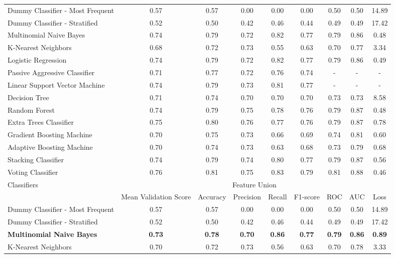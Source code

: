 \documentclass[Royal,sageapa,times]{sagej}
\begin{document}
\begin{landscape}
\begin{longtable}[l]{lcccccccc}
    Dummy Classifier - Most   Frequent & 0.57 & 0.57 & 0.00 & 0.00 & 0.00 & 0.50 & 0.50 & 14.89 \\
    Dummy Classifier - Stratified & 0.52 & 0.50 & 0.42 & 0.46 & 0.44 & 0.49 & 0.49 & 17.42 \\
    Multinomial Naive Bayes & 0.74 & 0.79 & 0.72 & 0.82 & 0.77 & 0.79 & 0.86 & 0.48 \\
    K-Nearest Neighbors & 0.68 & 0.72 & 0.73 & 0.55 & 0.63 & 0.70 & 0.77 & 3.34 \\
    Logistic Regression & 0.74 & 0.79 & 0.72 & 0.82 & 0.77 & 0.79 & 0.86 & 0.49 \\
    Passive Aggressive Classifier & 0.71 & 0.77 & 0.72 & 0.76 & 0.74 & - & - & - \\
    Linear Support Vector Machine & 0.74 & 0.79 & 0.73 & 0.81 & 0.77 & - & - & - \\
    Decision Tree & 0.71 & 0.74 & 0.70 & 0.70 & 0.70 & 0.73 & 0.73 & 8.58 \\
    Random Forest & 0.74 & 0.79 & 0.75 & 0.78 & 0.76 & 0.79 & 0.87 & 0.48 \\
    Extra Trees Classifier & 0.75 & 0.80 & 0.76 & 0.77 & 0.76 & 0.79 & 0.87 & 0.78 \\
    Gradient Boosting Machine & 0.70 & 0.75 & 0.73 & 0.66 & 0.69 & 0.74 & 0.81 & 0.60 \\
    Adaptive Boosting Machine & 0.70 & 0.74 & 0.73 & 0.63 & 0.68 & 0.73 & 0.79 & 0.68 \\
    Stacking Classifier & 0.74 & 0.79 & 0.74 & 0.80 & 0.77 & 0.79 & 0.87 & 0.56 \\
    Voting Classifier & 0.76 & 0.81 & 0.75 & 0.83 & 0.79 & 0.81 & 0.88 & 0.46 \\ \hline
    \multirow{2}{*}{Classifiers} & \multicolumn{8}{c}{Feature Union} \\ \cline{2-9}
    & Mean   Validation Score & Accuracy & Precision & Recall & F1-score & ROC & AUC & Loss \\ \hline
    Dummy Classifier - Most   Frequent & 0.57 & 0.57 & 0.00 & 0.00 & 0.00 & 0.50 & 0.50 & 14.89 \\
    Dummy Classifier - Stratified & 0.52 & 0.50 & 0.42 & 0.46 & 0.44 & 0.49 & 0.49 & 17.42 \\
    \textbf{Multinomial Naive Bayes} & \textbf{0.73} & \textbf{0.78} & \textbf{0.70} & \textbf{0.86} & \textbf{0.77} & \textbf{0.79} & \textbf{0.86} & \textbf{0.89} \\
    K-Nearest Neighbors & 0.70 & 0.72 & 0.73 & 0.56 & 0.63 & 0.70 & 0.78 & 3.33 \\

\end{longtable}
\end{landscape}
\end{document}
